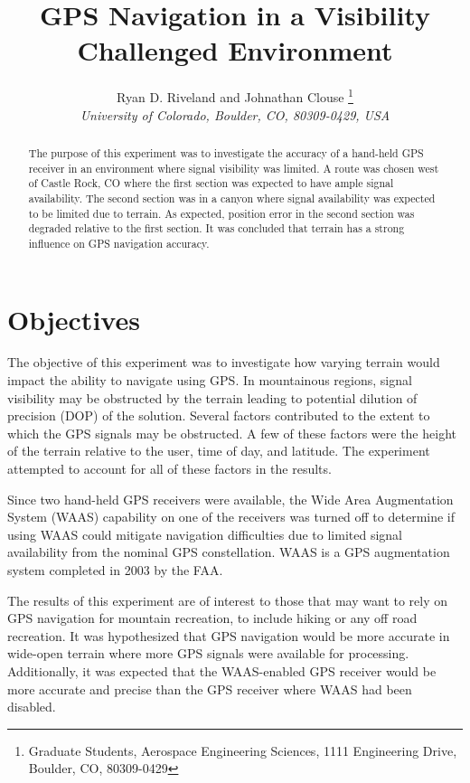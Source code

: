 \documentclass[]{aiaa-tc}%
\title{GPS Navigation in a Visibility Challenged Environment}
\author{
	Ryan D. Riveland and Johnathan Clouse%
	\thanks{Graduate Students, Aerospace Engineering Sciences, 1111 Engineering Drive, Boulder, CO, 80309-0429}\\
	{\normalsize\itshape
		University of Colorado, Boulder, CO, 80309-0429, USA}
}
\begin{document}
	

	
	\maketitle
	
	\begin{abstract}
		\noindent The purpose of this experiment was to investigate the accuracy of a hand-held GPS receiver in an environment where signal visibility was limited. A route was chosen west of Castle Rock, CO where the first section was expected to have ample signal availability. The second section was in a canyon where signal availability was expected to be limited due to terrain. As expected, position error in the second section was degraded relative to the first section. It was concluded that terrain has a strong influence on GPS navigation accuracy.
		
	\end{abstract}
	
	\newpage
	
	\tableofcontents
	
	\newpage
	
	\section{Objectives}
	
	\noindent The objective of this experiment was to investigate how varying terrain would impact the ability to navigate using GPS. In mountainous regions, signal visibility may be obstructed by the terrain leading to potential dilution of precision (DOP) of the solution. Several factors contributed to the extent to which the GPS signals may be obstructed. A few of these factors were the height of the terrain relative to the user, time of day, and latitude. The experiment attempted to account for all of these factors in the results. 
	
	\vspace{5 mm}
	
	\noindent Since two hand-held GPS receivers were available, the Wide Area Augmentation System (WAAS) capability on one of the receivers was turned off to determine if using WAAS could mitigate navigation difficulties due to limited signal availability from the nominal GPS constellation. WAAS is a GPS augmentation system completed in 2003 by the FAA\cite{Misra:2012}. 
	
	\vspace{5 mm}
	
	\noindent The results of this experiment are of interest to those that may want to rely on GPS navigation for mountain recreation, to include hiking or any off road recreation. It was hypothesized that GPS navigation would be more accurate in wide-open terrain where more GPS signals were available for processing. Additionally, it was expected that the WAAS-enabled GPS receiver would be more accurate and precise than the GPS receiver where WAAS had been disabled.
	
\end{document}

